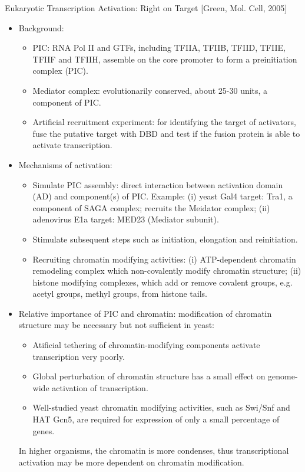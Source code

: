 \documentclass{report}
\begin{document}
Eukaryotic Transcription Activation: Right on Target [Green, Mol. Cell, 2005]
\begin{itemize}
	\item Background: 
	\begin{itemize}
		\item PIC: RNA Pol II and GTFs, including TFIIA, TFIIB, TFIID, TFIIE, TFIIF and TFIIH, assemble on the core promoter to form a preinitiation complex (PIC). 
		\item Mediator complex: evolutionarily conserved, about 25-30 units, a component of PIC. 
		\item Artificial recruitment experiment: for identifying the target of activators, fuse the putative target with DBD and test if the fusion protein is able to activate transcription. 
	\end{itemize}
	
	\item Mechanisms of activation: 
	\begin{itemize}
		\item Simulate PIC assembly: direct interaction between activation domain (AD) and component(s) of PIC. Example: (i) yeast Gal4 target: Tra1, a component of SAGA complex; recruits the Meidator complex; (ii) adenovirus E1a target: MED23 (Mediator subunit). 
		\item Stimulate subsequent steps such as initiation, elongation and reinitiation. 
		\item Recruiting chromatin modifying activities: (i) ATP-dependent chromatin remodeling complex which non-covalently modify chromatin structure; (ii) histone modifying complexes, which add or remove covalent groups, e.g. acetyl groups, methyl groups, from histone tails. 
	\end{itemize}
	
	\item Relative importance of PIC and chromatin: modification of chromatin structure may be necessary but not sufficient in yeast: 
	\begin{itemize}
		\item Atificial tethering of chromatin-modifying components activate transcription very poorly. 
		\item Global perturbation of chromatin structure has a small effect on genome-wide activation of transcription. 
		\item Well-studied yeast chromatin modifying activities, such as Swi/Snf and HAT Gcn5, are required for expression of only a small percentage of genes. 
	\end{itemize}
	In higher organisms, the chromatin is more condenses, thus transcriptional activation may be more dependent on chromatin modification. 
	

\end{itemize}
\end{document}
